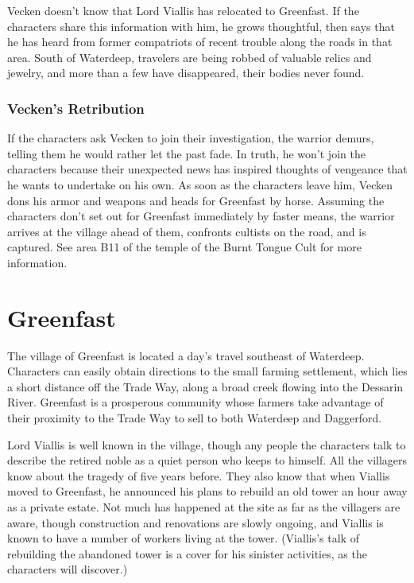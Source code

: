 \documentclass[10pt,a4paper,twoside,bg=print,twocolumn,openany,nodeprecatedcode]{dndbook}
\begin{document}
Vecken doesn't know that Lord Viallis has relocated to Greenfast. If the characters share this information with him, he grows thoughtful, then says that he has heard from former compatriots of recent trouble along the roads in that area. South of Waterdeep, travelers are being robbed of valuable relics and jewelry, and more than a few have disappeared, their bodies never found.

\subsubsection{Vecken's Retribution}
If the characters ask Vecken to join their investigation, the warrior demurs, telling them he would rather let the past fade. In truth, he won't join the characters because their unexpected news has inspired thoughts of vengeance that he wants to undertake on his own. As soon as the characters leave him, Vecken dons his armor and weapons and heads for Greenfast by horse. Assuming the characters don't set out for Greenfast immediately by faster means, the warrior arrives at the village ahead of them, confronts cultists on the road, and is captured. See area B11 of the temple of the Burnt Tongue Cult for more information.

\section{Greenfast}
The village of Greenfast is located a day's travel southeast of Waterdeep. Characters can easily obtain directions to the small farming settlement, which lies a short distance off the Trade Way, along a broad creek flowing into the Dessarin River. Greenfast is a prosperous community whose farmers take advantage of their proximity to the Trade Way to sell to both Waterdeep and Daggerford.

Lord Viallis is well known in the village, though any people the characters talk to describe the retired noble as a quiet person who keeps to himself. All the villagers know about the tragedy of five years before. They also know that when Viallis moved to Greenfast, he announced his plans to rebuild an old tower an hour away as a private estate. Not much has happened at the site as far as the villagers are aware, though construction and renovations are slowly ongoing, and Viallis is known to have a number of workers living at the tower. (Viallis's talk of rebuilding the abandoned tower is a cover for his sinister activities, as the characters will discover.)
\end{document}
